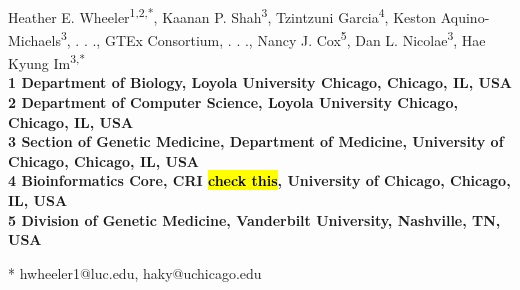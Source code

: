 \documentclass[10pt,letterpaper]{article}
\date{}
\begin{document}
\vspace*{0.35in}

\begin{flushleft}
{\Large
\textbf{}
}
\newline
\\
Heather E. Wheeler\textsuperscript{1,2,*},
Kaanan P. Shah\textsuperscript{3},
Tzintzuni Garcia\textsuperscript{4},
Keston Aquino-Michaels\textsuperscript{3},
. . .,
GTEx Consortium,
. . ., Nancy J. Cox\textsuperscript{5}, Dan L.
Nicolae\textsuperscript{3}, Hae Kyung Im\textsuperscript{3,*}
\\
\bigskip
\bf{1} Department of Biology, Loyola University Chicago, Chicago, IL, USA
\\
\bf{2} Department of Computer Science, Loyola University Chicago, Chicago, IL, USA
\\
\bf{3} Section of Genetic Medicine, Department of Medicine, University of Chicago, Chicago, IL, USA
\\
\bf{4} Bioinformatics Core, CRI \hl{check this},  University of Chicago, Chicago, IL, USA
\\
\bf{5} Division of Genetic Medicine, Vanderbilt University, Nashville, TN, USA
\bigskip

% 
%





* hwheeler1@luc.edu, haky@uchicago.edu

\end{flushleft}
\end{document}
